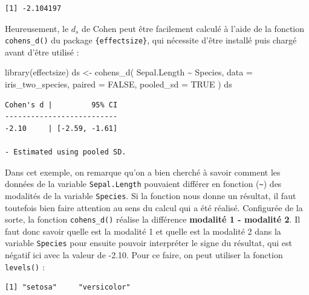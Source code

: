 \documentclass[
  letterpaper,
]{book}
\newenvironment{Shaded}{\begin{snugshade}}{\end{snugshade}}
\newcommand{\AttributeTok}[1]{\textcolor[rgb]{0.40,0.45,0.13}{#1}}
\newcommand{\ConstantTok}[1]{\textcolor[rgb]{0.56,0.35,0.01}{#1}}
\newcommand{\FunctionTok}[1]{\textcolor[rgb]{0.28,0.35,0.67}{#1}}
\newcommand{\NormalTok}[1]{\textcolor[rgb]{0.00,0.23,0.31}{#1}}
\newcommand{\OtherTok}[1]{\textcolor[rgb]{0.00,0.23,0.31}{#1}}
\newcommand{\SpecialCharTok}[1]{\textcolor[rgb]{0.37,0.37,0.37}{#1}}
\begin{document}
\begin{verbatim}
[1] -2.104197
\end{verbatim}

Heureusement, le \(d_{s}\) de Cohen peut être facilement calculé à
l'aide de la fonction \texttt{cohens\_d()} du package
\texttt{\{effectsize\}}, qui nécessite d'être installé puis chargé avant
d'être utilisé :

\begin{Shaded}
\begin{Highlighting}[]
\FunctionTok{library}\NormalTok{(effectsize)}
\NormalTok{ds }\OtherTok{\textless{}{-}}
  \FunctionTok{cohens\_d}\NormalTok{(}
\NormalTok{    Sepal.Length }\SpecialCharTok{\textasciitilde{}}\NormalTok{ Species,}
    \AttributeTok{data =}\NormalTok{ iris\_two\_species,}
    \AttributeTok{paired =} \ConstantTok{FALSE}\NormalTok{,}
    \AttributeTok{pooled\_sd =} \ConstantTok{TRUE}
\NormalTok{  )}
\NormalTok{ds}
\end{Highlighting}
\end{Shaded}

\begin{verbatim}
Cohen's d |         95% CI
--------------------------
-2.10     | [-2.59, -1.61]

- Estimated using pooled SD.
\end{verbatim}

Dans cet exemple, on remarque qu'on a bien cherché à savoir comment les
données de la variable \texttt{Sepal.Length} pouvaient différer en
fonction (\texttt{\textasciitilde{}}) des modalités de la variable
\texttt{Species}. Si la fonction nous donne un résultat, il faut
toutefois bien faire attention au sens du calcul qui a été réalisé.
Configurée de la sorte, la fonction \texttt{cohens\_d()} réalise la
différence \textbf{modalité 1 - modalité 2}. Il faut donc savoir quelle
est la modalité 1 et quelle est la modalité 2 dans la variable
\texttt{Species} pour ensuite pouvoir interpréter le signe du résultat,
qui est négatif ici avec la valeur de -2.10. Pour ce faire, on peut
utiliser la fonction \texttt{levels()} :

\begin{Shaded}
\end{Shaded}

\begin{verbatim}
[1] "setosa"     "versicolor"
\end{verbatim}
\end{document}
